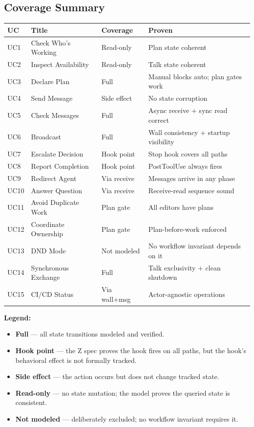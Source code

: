 \documentclass[a4paper,10pt,fleqn]{article}
\begin{document}
\subsection{Coverage Summary}

\begin{tabular}{llll}
\hline
\textbf{UC} & \textbf{Title} & \textbf{Coverage} & \textbf{Proven} \\
\hline
UC1 & Check Who's Working & Read-only & Plan state coherent \\
UC2 & Inspect Availability & Read-only & Talk state coherent \\
UC3 & Declare Plan & Full & Manual blocks auto; plan gates work \\
UC4 & Send Message & Side effect & No state corruption \\
UC5 & Check Messages & Full & Async receive + sync read correct \\
UC6 & Broadcast & Full & Wall consistency + startup visibility \\
UC7 & Escalate Decision & Hook point & Stop hook covers all paths \\
UC8 & Report Completion & Hook point & PostToolUse always fires \\
UC9 & Redirect Agent & Via receive & Messages arrive in any phase \\
UC10 & Answer Question & Via receive & Receive-read sequence sound \\
UC11 & Avoid Duplicate Work & Plan gate & All editors have plans \\
UC12 & Coordinate Ownership & Plan gate & Plan-before-work enforced \\
UC13 & DND Mode & Not modeled & No workflow invariant depends on it \\
UC14 & Synchronous Exchange & Full & Talk exclusivity + clean shutdown \\
UC15 & CI/CD Status & Via wall+msg & Actor-agnostic operations \\
\hline
\end{tabular}

\textbf{Legend:}
\begin{itemize}
  \item \textbf{Full} --- all state transitions modeled and verified.
  \item \textbf{Hook point} --- the Z spec proves the hook fires on all
    paths, but the hook's behavioral effect is not formally tracked.
  \item \textbf{Side effect} --- the action occurs but does not change
    tracked state.
  \item \textbf{Read-only} --- no state mutation; the model proves the
    queried state is consistent.
  \item \textbf{Not modeled} --- deliberately excluded; no workflow
    invariant requires it.
\end{itemize}
\end{document}
